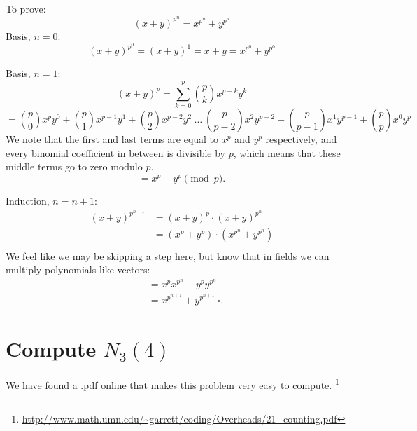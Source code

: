 \documentclass{article}
\begin{document}
To prove:
\[ (x+y)^{p^n} = x^{p^n} + y^{p^n} \]
Basis, $n=0$:
\[ (x+y)^{p^0} = (x+y)^1 = x + y = x^{p^0} + y^{p^0} \]

Basis, $n=1$:
\[ (x+y)^p = \sum_{k=0}^{p} {p \choose k} x^{p-k} y^{k}  \]
\[ = {p \choose 0} x^{p} y^{0} + {p \choose 1} x^{p-1} y^{1} + {p \choose 2} x^{p-2} y^{2}~ \dots~{p \choose p-2} x^{2} y^{p-2} + {p \choose p-1} x^{1} y^{p-1} + {p \choose p} x^{0} y^{p} \]
We note that the first and last terms are equal to $x^p$ and $y^p$ respectively, and every binomial coefficient in between is divisible by $p$, which means that these middle terms go to zero modulo $p$.
\[ = x^{p} + y^{p} \pmod p. \]


Induction, $n=n+1$:
\begin{equation*}
\begin{aligned}
(x+y)^{p^{n+1}} &= (x+y)^p \cdot (x+y)^{p^n} \\
&= (x^p+y^p) \cdot (x^{p^n}+y^{p^n}) \\
\end{aligned}
\end{equation*}
We feel like we may be skipping a step here, but know that in fields we can multiply polynomials like vectors:
\begin{equation*}
\begin{aligned}
&= x^p x^{p^n} + y^p y^{p^n} \\
&= x^{p^{n+1}} + y^{p^{n+1}}~\square.
\end{aligned}
\end{equation*}

\section{Compute $N_3(4)$} 

We have found a .pdf online that makes this problem very easy to compute.
\footnote{\url{http://www.math.umn.edu/~garrett/coding/Overheads/21_counting.pdf}}
\end{document}
